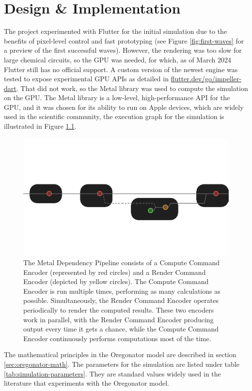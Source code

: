 \chapter{Design \& Implementation}
The project experimented with Flutter for the initial simulation due to the benefits of pixel-level control and fast prototyping (see Figure \ref{fig:first-waves} for a preview of the first successful waves). However, the rendering was too slow for large chemical circuits, so the GPU was needed, for which, as of March 2024 Flutter still has no official support. A custom version of the newest engine was tested to expose experimental GPU APIs as detailed in \href{flutter.dev/go/impeller-dart}{flutter.dev/go/impeller-dart}.
That did not work, so the Metal library was used to compute the simulation on the GPU. 
The Metal library is a low-level, high-performance API for the GPU, and it was chosen for its ability to run on Apple devices, which are widely used in the scientific community, the execution graph for the simulation is illustrated in Figure \ref{fig:metal-dependency-pipline}.

\begin{figure}
    \centering
    \includegraphics[width=0.5\linewidth]{metal-pipeline.png}
    \caption{The Metal Dependency Pipeline consists of a Compute Command Encoder (represented by red circles) and a Render Command Encoder (depicted by yellow circles). The Compute Command Encoder is run multiple times, performing as many calculations as possible. Simultaneously, the Render Command Encoder operates periodically to render the computed results. These two encoders work in parallel, with the Render Command Encoder producing output every time it gets a chance, while the Compute Command Encoder continuously performs computations most of the time.}
    \label{fig:metal-dependency-pipline}
\end{figure}


The mathematical principles in the Oregonator model are described in section \ref{sec:oregonator-math}.
The parameters for the simulation are listed under table \ref{tab:simulation-parameters}. 
They are standard values widely used in the literature that experiments with the Oregonator model.



